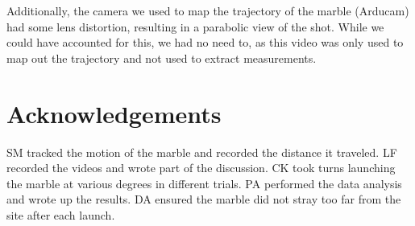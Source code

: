 \documentclass[amsmath,amssymb,aps,endfloats,linenumbers]{revtex4-2}
\begin{document}
Additionally, the camera we used to map the trajectory of the marble (Arducam) had some lens distortion, resulting in a parabolic view of the shot. While we could have accounted for this, we had no need to, as this video was only used to map out the trajectory and not used to extract measurements.


\section{Acknowledgements}
SM tracked the motion of the marble and recorded the distance it traveled. LF recorded the videos and wrote part of the discussion. CK took turns launching the marble at various degrees in different trials. PA performed the data analysis and wrote up the results. DA ensured the marble did not stray too far from the site after each launch.




%
%
%
\end{document}
